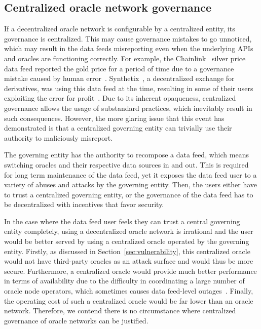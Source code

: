 \documentclass[11pt]{article}
\begin{document}
\subsection{Centralized oracle network governance}
\label{sec:centralized-oracle-network-governance}

If a decentralized oracle network is configurable by a centralized entity, its governance is centralized.
This may cause governance mistakes to go unnoticed, which may result in the data feeds misreporting even when the underlying APIs and oracles are functioning correctly.
For example, the Chainlink~\cite{ellis:2017} silver price data feed reported the gold price for a period of time due to a governance mistake caused by human error~\cite{chainlink-fatfinger}.
Synthetix~\cite{synthetix:2020}, a decentralized exchange for derivatives, was using this data feed at the time, resulting in some of their users exploiting the error for profit~\cite{synthetix-fatfinger}.
Due to its inherent opaqueness, centralized governance allows the usage of substandard practices, which inevitably result in such consequences.
However, the more glaring issue that this event has demonstrated is that a centralized governing entity can trivially use their authority to maliciously misreport.

The governing entity has the authority to recompose a data feed, which means switching oracles and their respective data sources in and out.
This is required for long term maintenance of the data feed, yet it exposes the data feed user to a variety of abuses and attacks by the governing entity.
Then, the users either have to trust a centralized governing entity, or the governance of the data feed has to be decentralized with incentives that favor security.

In the case where the data feed user feels they can trust a central governing entity completely, using a decentralized oracle network is irrational and the user would be better served by using a centralized oracle operated by the governing entity.
Firstly, as discussed in Section~\ref{sec:vulnerability}, this centralized oracle would not have third-party oracles as an attack surface and would thus be more secure.
Furthermore, a centralized oracle would provide much better performance in terms of availability due to the difficulty in coordinating a large number of oracle node operators, which sometimes causes data feed-level outages~\cite{chainlink-outage}.
Finally, the operating cost of such a centralized oracle would be far lower than an oracle network.
Therefore, we contend there is no circumstance where centralized governance of oracle networks can be justified.
\end{document}
